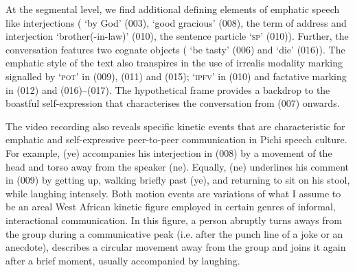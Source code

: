 At the segmental level, we find additional defining elements of emphatic speech like interjections ( ‘by God’ (003),  ‘good gracious’ (008), the term of address and interjection  ‘brother(-in-law)’ (010), the sentence particle  ‘\textsc{sp}’ (010)). Further, the conversation features two cognate objects ( ‘be tasty’ (006) and  ‘die’ (016)). The emphatic style of the text also transpires in the use of irrealis modality marking signalled by  ‘\textsc{pot}’ in (009), (011) and (015);  ‘\textsc{ipfv}’ in (010) and factative marking in (012) and (016)–(017). The hypothetical frame provides a backdrop to the boastful self-expression that characterises the conversation from (007) onwards. 



The video recording also reveals specific kinetic events that are characteristic for emphatic and self-expressive peer-to-peer communication in Pichi speech culture. For example, (ye) accompanies his interjection in (008) by a movement of the head and torso away from the speaker (ne). Equally, (ne) underlines his comment in (009) by getting up, walking briefly past (ye), and returning to sit on his stool, while laughing intensely. Both motion events are variations of what I assume to be an areal West African kinetic figure employed in certain genres of informal, interactional communication. In this figure, a person abruptly turns aways from the group during a communicative peak (i.e. after the punch line of a joke or an anecdote), describes a circular movement away from the group and joins it again after a brief moment, usually accompanied by laughing.

\setcounter{equation}{0}  %

